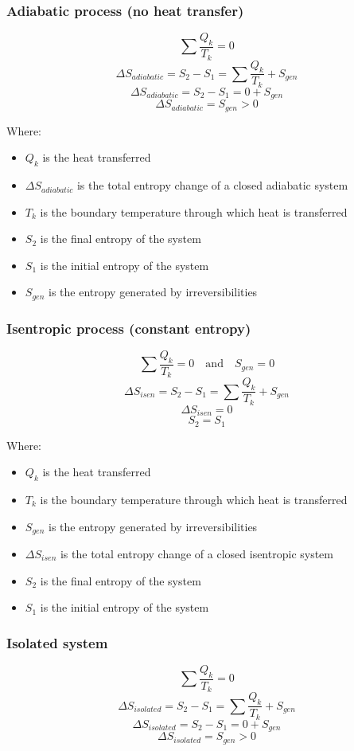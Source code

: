 \documentclass[11pt]{article}
\begin{document}
\subsubsection{Adiabatic process (no heat transfer)}
\label{sec:org230ff56}
\[\sum \frac{Q_k}{T_k} = 0\]
\[\Delta S_{adiabatic} = S_2 - S_1 = \sum \frac{Q_k}{T_k} + S_{gen}\]
\[\Delta S_{adiabatic} = S_2 - S_1 = 0 + S_{gen}\]
\[\Delta S_{adiabatic} = S_{gen} > 0\]

Where:
\begin{itemize}
\item \(Q_k\) is the heat transferred
\item \(\Delta S_{adiabatic}\) is the total entropy change of a closed adiabatic system
\item \(T_k\) is the boundary temperature through which heat is transferred
\item \(S_2\) is the final entropy of the system
\item \(S_1\) is the initial entropy of the system
\item \(S_{gen}\) is the entropy generated by irreversibilities
\end{itemize}

\subsubsection{Isentropic process (constant entropy)}
\label{sec:orgf5c4112}
\[\sum \frac{Q_k}{T_k} = 0 \quad \text{and} \quad S_{gen} = 0\]
\[\Delta S_{isen} = S_2 - S_1 = \sum \frac{Q_k}{T_k} + S_{gen}\]
\[\Delta S_{isen} = 0\]
\[S_2 = S_1\]

Where:
\begin{itemize}
\item \(Q_k\) is the heat transferred
\item \(T_k\) is the boundary temperature through which heat is transferred
\item \(S_{gen}\) is the entropy generated by irreversibilities
\item \(\Delta S_{isen}\) is the total entropy change of a closed isentropic system
\item \(S_2\) is the final entropy of the system
\item \(S_1\) is the initial entropy of the system
\end{itemize}

\subsubsection{Isolated system}
\label{sec:org7fe4ca7}
\[\sum \frac{Q_k}{T_k} = 0\]
\[\Delta S_{isolated} = S_2 - S_1 = \sum \frac{Q_k}{T_k} + S_{gen}\]
\[\Delta S_{isolated} = S_2 - S_1 = 0 + S_{gen}\]
\[\Delta S_{isolated} = S_{gen} > 0\]
\end{document}
